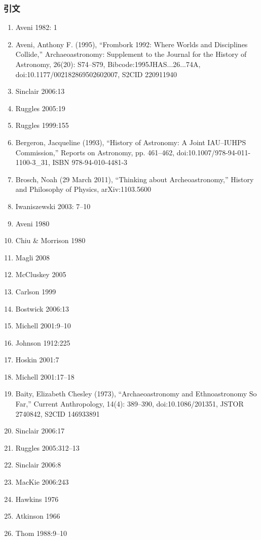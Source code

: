 \subsubsection{引文}
\begin{enumerate}
    \item Aveni 1982: 1
    \item Aveni, Anthony F. (1995), “Frombork 1992: Where Worlds and Disciplines Collide,” Archaeoastronomy: Supplement to the Journal for the History of Astronomy, 26(20): S74–S79, Bibcode:1995JHAS...26...74A, doi:10.1177/002182869502602007, S2CID 220911940
    \item Sinclair 2006:13
    \item Ruggles 2005:19
    \item Ruggles 1999:155
    \item Bergeron, Jacqueline (1993), “History of Astronomy: A Joint IAU–IUHPS Commission,” Reports on Astronomy, pp. 461–462, doi:10.1007/978-94-011-1100-3\_31, ISBN 978-94-010-4481-3
    \item Brosch, Noah (29 March 2011), “Thinking about Archeoastronomy,” History and Philosophy of Physics, arXiv:1103.5600
    \item Iwaniszewski 2003: 7–10
    \item Aveni 1980
    \item Chiu \& Morrison 1980
    \item Magli 2008
    \item McCluskey 2005
    \item Carlson 1999
    \item Bostwick 2006:13
    \item Michell 2001:9–10
    \item Johnson 1912:225
    \item Hoskin 2001:7
    \item Michell 2001:17–18
    \item Baity, Elizabeth Chesley (1973), “Archaeoastronomy and Ethnoastronomy So Far,” Current Anthropology, 14(4): 389–390, doi:10.1086/201351, JSTOR 2740842, S2CID 146933891
    \item Sinclair 2006:17
    \item Ruggles 2005:312–13
    \item Sinclair 2006:8
    \item MacKie 2006:243
    \item Hawkins 1976
    \item Atkinson 1966
    \item Thom 1988:9–10

\end{enumerate}
